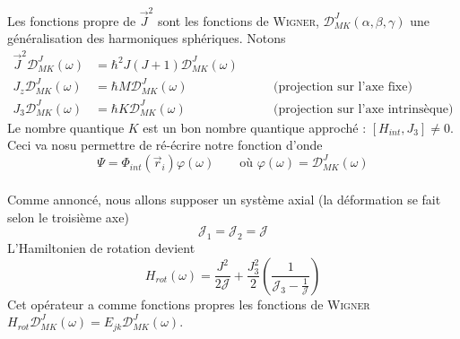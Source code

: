 Les fonctions propre de $\vec{J}^2$ sont les fonctions de \textsc{Wigner}, $\mathcal{D}_{MK}^J(\alpha,\beta,
\gamma)$ une généralisation des harmoniques sphériques. Notons
\begin{equation}
\begin{array}{lll}
\vec{J}^2\mathcal{D}_{MK}^J(\omega) &= \hbar^2J(J+1)\mathcal{D}_{MK}^J(\omega)\\
J_z\mathcal{D}_{MK}^J(\omega) &= \hbar M\mathcal{D}_{MK}^J(\omega)&\qquad \text{(projection sur l'axe fixe)}\\
J_3\mathcal{D}_{MK}^J(\omega) &= \hbar K\mathcal{D}_{MK}^J(\omega)&\qquad \text{(projection sur l'axe intrinsèque)}
\end{array}
\end{equation}
Le nombre quantique $K$ est un bon nombre quantique approché : $[H_{int}, J_3]\neq0$. Ceci va nosu permettre
de ré-écrire notre fonction d'onde
\begin{equation}
\Psi = \Phi_{int}(\vec r_i)\varphi(\omega)\qquad\text{où } \varphi(\omega) = \mathcal{D}_{MK}^J(\omega)
\end{equation}\ \\

Comme annoncé, nous allons supposer un système axial (la déformation se fait selon le troisième axe)
\begin{equation}
\mathcal{J}_1 = \mathcal{J}_2 = \mathcal{J}
\end{equation}
L'Hamiltonien de rotation devient
\begin{equation}
H_{rot}(\omega) = \frac{J^2}{2\mathcal{J}}+\frac{J_3^2}{2}\left(\frac{1}{\mathcal{J}_3-\frac{1}{\mathcal{J}}}
\right)
\end{equation}
Cet opérateur a comme fonctions propres les fonctions de \textsc{Wigner} $H_{rot}\mathcal{D}_{MK}^J(\omega) =
E_{jk}\mathcal{D}_{MK}^J(\omega)$.\\

\ \\

